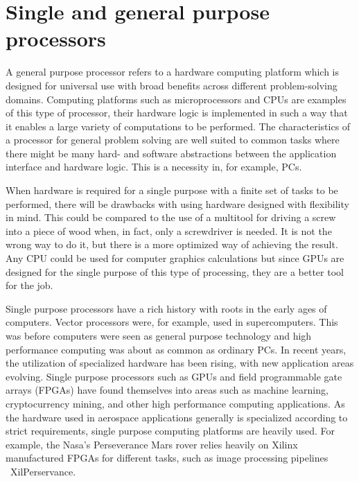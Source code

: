 \documentclass[12pt]{report}
\begin{document}
\section{Single and general purpose processors}
A general purpose processor refers to a hardware computing platform which is designed for universal use with broad benefits across different problem-solving domains. Computing platforms such as microprocessors and CPUs are examples of this type of processor, their hardware logic is implemented in such a way that it enables a large variety of computations to be performed. 
The characteristics of a processor for general problem solving are well suited to common tasks where there might be many hard- and software abstractions between the application interface and hardware logic. This is a necessity in, for example, PCs.
\par
When hardware is required for a single purpose with a finite set of tasks to be performed, there will be drawbacks with using hardware designed with flexibility in mind. This could be compared to the use of a multitool for driving a screw into a piece of wood when, in fact, only a screwdriver is needed. It is not the wrong way to do it, but there is a more optimized way of achieving the result. Any CPU could be used for computer graphics calculations but since GPUs are designed for the single purpose of this type of processing, they are a better tool for the job.
\par
Single purpose processors have a rich history with roots in the early ages of computers. Vector processors were, for example, used in supercomputers.
This was before computers were seen as general purpose technology and high performance computing was about as common as ordinary PCs.
In recent years, the utilization of specialized hardware has been rising, with new application areas evolving. Single purpose processors such as GPUs and field programmable gate arrays (FPGAs) have found themselves into areas such as machine learning, cryptocurrency mining, and other high performance computing applications.
As the hardware used in aerospace applications generally is specialized according to strict requirements, single purpose computing platforms are heavily used. For example, the Nasa's Perseverance Mars rover relies heavily on Xilinx manufactured FPGAs for different tasks, such as image processing pipelines \
{XilPerservance}.
\end{document}
